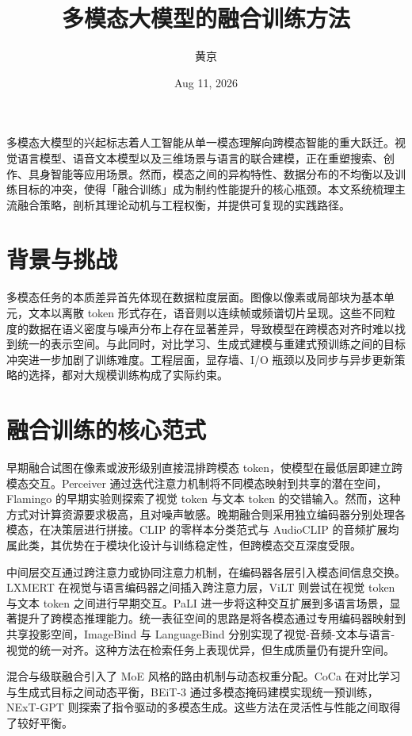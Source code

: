 \title{多模态大模型的融合训练方法}
\author{黄京}
\date{Aug 11, 2026}
\maketitle
多模态大模型的兴起标志着人工智能从单一模态理解向跨模态智能的重大跃迁。视觉语言模型、语音文本模型以及三维场景与语言的联合建模，正在重塑搜索、创作、具身智能等应用场景。然而，模态之间的异构特性、数据分布的不均衡以及训练目标的冲突，使得「融合训练」成为制约性能提升的核心瓶颈。本文系统梳理主流融合策略，剖析其理论动机与工程权衡，并提供可复现的实践路径。\par
\chapter{背景与挑战}
多模态任务的本质差异首先体现在数据粒度层面。图像以像素或局部块为基本单元，文本以离散 token 形式存在，语音则以连续帧或频谱切片呈现。这些不同粒度的数据在语义密度与噪声分布上存在显著差异，导致模型在跨模态对齐时难以找到统一的表示空间。与此同时，对比学习、生成式建模与重建式预训练之间的目标冲突进一步加剧了训练难度。工程层面，显存墙、I/O 瓶颈以及同步与异步更新策略的选择，都对大规模训练构成了实际约束。\par
\chapter{融合训练的核心范式}
早期融合试图在像素或波形级别直接混排跨模态 token，使模型在最低层即建立跨模态交互。Perceiver 通过迭代注意力机制将不同模态映射到共享的潜在空间，Flamingo 的早期实验则探索了视觉 token 与文本 token 的交错输入。然而，这种方式对计算资源要求极高，且对噪声敏感。晚期融合则采用独立编码器分别处理各模态，在决策层进行拼接。CLIP 的零样本分类范式与 AudioCLIP 的音频扩展均属此类，其优势在于模块化设计与训练稳定性，但跨模态交互深度受限。\par
中间层交互通过跨注意力或协同注意力机制，在编码器各层引入模态间信息交换。LXMERT 在视觉与语言编码器之间插入跨注意力层，ViLT 则尝试在视觉 token 与文本 token 之间进行早期交互。PaLI 进一步将这种交互扩展到多语言场景，显著提升了跨模态推理能力。统一表征空间的思路是将各模态通过专用编码器映射到共享投影空间，ImageBind 与 LanguageBind 分别实现了视觉-音频-文本与语言-视觉的统一对齐。这种方法在检索任务上表现优异，但生成质量仍有提升空间。\par
混合与级联融合引入了 MoE 风格的路由机制与动态权重分配。CoCa 在对比学习与生成式目标之间动态平衡，BEiT-3 通过多模态掩码建模实现统一预训练，NExT-GPT 则探索了指令驱动的多模态生成。这些方法在灵活性与性能之间取得了较好平衡。\par
